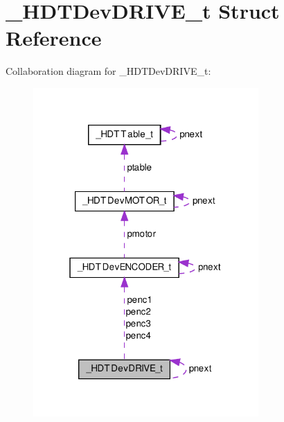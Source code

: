 \hypertarget{struct___h_d_t_dev_d_r_i_v_e__t}{\section{\-\_\-\-H\-D\-T\-Dev\-D\-R\-I\-V\-E\-\_\-t \-Struct \-Reference}
\label{struct___h_d_t_dev_d_r_i_v_e__t}
}


\-Collaboration diagram for \-\_\-\-H\-D\-T\-Dev\-D\-R\-I\-V\-E\-\_\-t\-:\nopagebreak
\begin{figure}[H]
\begin{center}
\leavevmode
\includegraphics[width=244pt]{struct___h_d_t_dev_d_r_i_v_e__t__coll__graph}
\end{center}
\end{figure}
